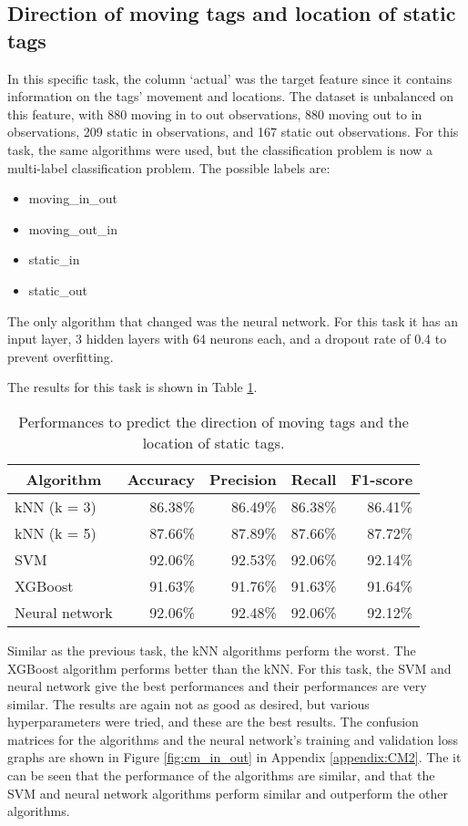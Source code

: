 \documentclass{article}
\begin{document}
\subsection{Direction of moving tags and location of static tags}

In this specific task, the column `actual' was the target feature since it contains information on the tags' movement and locations.
The dataset is unbalanced on this feature, with 880 moving in to out observations, 880 moving out to in observations, 209 static in observations, and 167 static out observations.
For this task, the same algorithms were used, but the classification problem is now a multi-label classification problem.
The possible labels are:
\begin{itemize}
    \item moving\_in\_out
    \item moving\_out\_in
    \item static\_in
    \item static\_out
\end{itemize}
The only algorithm that changed was the neural network.
For this task it has an input layer, 3 hidden layers with 64 neurons each, and a dropout rate of 0.4 to prevent overfitting.

The results for this task is shown in Table \ref{tab:Mov_dir_stat_loc_clas}.
%
\begin{table}[h!]
\centering
\setlength{\belowcaptionskip}{7pt}
\caption{Performances to predict the direction of moving tags and the location of static tags.}
\label{tab:Mov_dir_stat_loc_clas}
\begin{tabular}{@{}lrrrr@{}}
\toprule
\multicolumn{1}{c}{\textbf{Algorithm}} & \multicolumn{1}{c}{\textbf{Accuracy}} & \multicolumn{1}{c}{\textbf{Precision}} & \multicolumn{1}{c}{\textbf{Recall}} & \multicolumn{1}{c}{\textbf{F1-score}} \\ \midrule
kNN (k = 3)    & 86.38\%   & 86.49\%   & 86.38\%   & 86.41\%  \\
kNN (k = 5)    & 87.66\%   & 87.89\%   & 87.66\%   & 87.72\%  \\
SVM            & 92.06\%   & 92.53\%   & 92.06\%   & 92.14\%  \\
XGBoost        & 91.63\%   & 91.76\%   & 91.63\%   & 91.64\%  \\
Neural network & 92.06\%   & 92.48\%   & 92.06\%   & 92.12\%  \\ \bottomrule
\end{tabular}
\end{table}
%
Similar as the previous task, the \ac{kNN} algorithms perform the worst.
The XGBoost algorithm performs better than the \ac{kNN}.
For this task, the \ac{SVM} and neural network give the best performances and their performances are very similar.
The results are again not as good as desired, but various hyperparameters were tried, and these are the best results.
The confusion matrices for the algorithms and the neural network's training and validation loss graphs are shown in Figure \ref{fig:cm_in_out} in Appendix \ref{appendix:CM2}.
The it can be seen that the performance of the algorithms are similar, and that the \ac{SVM} and neural network algorithms perform similar and outperform the other algorithms.
\end{document}
